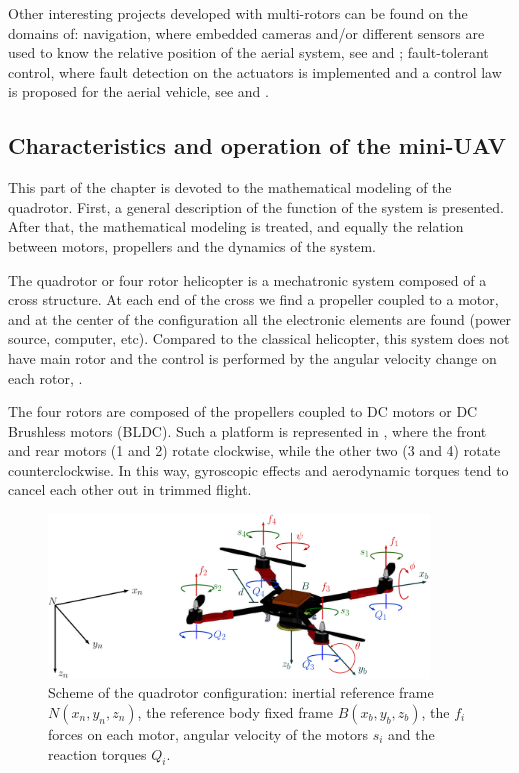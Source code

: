 Other interesting projects developed with multi-rotors can be found on the domains of: navigation, where embedded cameras and/or different sensors are used to know the relative position of the aerial system, see \cite{courbon:2009} and \cite{sebesta:2012}; fault-tolerant control, where fault detection on the actuators is implemented and a control law is proposed for the aerial vehicle, see \cite{sharifi:2010} and \cite{li:2013}.




 \subsection{Characteristics and operation of the mini-UAV}

 \label{subsubsection:quadri}

 This part of the chapter is devoted to the mathematical modeling of the quadrotor. First, a general description of the function of the system is presented. After that, the mathematical modeling is treated, and equally the relation between motors, propellers and the dynamics of the system.

 The quadrotor or four rotor helicopter is a mechatronic system composed of a cross structure. At each end of the cross we find a propeller coupled to a motor, and at the center of the configuration all the electronic elements are found (power source, computer, etc). Compared to the classical helicopter, this system does not have main rotor and the control is performed by the angular velocity change on each rotor, \cite{Nelson:1998}.

 The four rotors are composed of the propellers coupled to DC motors or DC Brushless motors (BLDC). Such a platform is represented in , where the front and rear motors (1 and 2) rotate clockwise, while the other two (3 and 4) rotate counterclockwise. In this way, gyroscopic effects and aerodynamic torques tend to cancel each other out in trimmed flight.
 \begin{figure}[h!]
     \centering
     \includegraphics[width =0.9\textwidth]{figures/quadoperation.pdf}
     \caption{Scheme of the quadrotor configuration: inertial reference frame $N(x_n,y_n,z_n)$, the reference body fixed frame $B(x_b,y_b,z_b)$, the $f_i$ forces on each motor, angular velocity of the motors $s_{i}$ and the reaction torques $Q_i$.}
     \label{fig:fourrotor}
   \end{figure}

